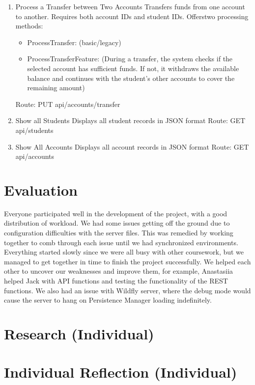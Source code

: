 \documentclass[12pt]{article}
\begin{document}
\begin{enumerate}
\begin{itemize}
	      \end{itemize}
	      \subitem Route: PUT api/accounts/{account\_ID}
	\item Process a Transfer between Two Accounts
	      \subitem Transfers funds from one account to another. Requires both account IDs and student IDs. Offerstwo processing methods:
	      \begin{itemize}
		      \item  ProcessTransfer: (basic/legacy)
		      \item  ProcessTransferFeature: (During a transfer, the system checks if the selected account has sufficient funds. If not, it withdraws the available balance and continues with the student's other accounts to cover the remaining amount)
	      \end{itemize}
	      \subitem Route: PUT api/accounts/transfer
	\item Show all Students
	      \subitem Displays all student records in JSON format
	      \subitem Route: GET api/students
	\item Show All Accounts
	      \subitem Displays all account records in JSON format
	      \subitem Route: GET api/accounts

\end{enumerate}

\newpage
\section{Evaluation}
Everyone participated well in the development of the project, with a good distribution of workload.
We had some issues getting off the ground due to configuration difficulties with the server files. This was remedied
by working together to comb through each issue until we had synchronized environments.
Everything started slowly since we were all busy with other coursework, but we managed to get together in time to finish the project successfully.
We helped each other to uncover our weaknesses and improve them, for example, Anastasiia helped Jack with API functions and testing the functionality of the REST functions.
We also had an issue with Wildfly server, where the debug mode would cause the server to hang on Persistence Manager loading indefinitely.

\section{Research (Individual)}


\section{Individual Reflection (Individual)}
\end{document}
